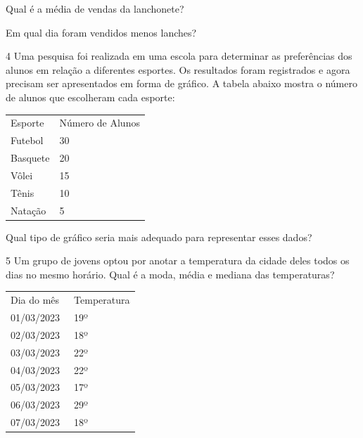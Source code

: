 \begin{escolha}

    \item Qual é a média de vendas da lanchonete?

    \item{}

    \item Em qual dia foram vendidos menos lanches?

    \item {}

\end{escolha}

\num{4} Uma pesquisa foi realizada em uma escola para determinar as
preferências dos alunos em relação a diferentes esportes. Os resultados
foram registrados e agora precisam ser apresentados em forma de gráfico.
A tabela abaixo mostra o número de alunos que escolheram cada
esporte:

\begin{longtable}[]{@{}ll@{}}
\toprule
\tabularnewline
\midrule
\endhead
Esporte & Número de Alunos\tabularnewline
Futebol & 30\tabularnewline
Basquete & 20\tabularnewline
Vôlei & 15\tabularnewline
Tênis & 10\tabularnewline
Natação & 5\tabularnewline
\bottomrule
\end{longtable}

Qual tipo de gráfico seria mais adequado para representar esses dados?


\num{5} Um grupo de jovens optou por anotar a temperatura da cidade deles
todos os dias no mesmo horário. Qual é a moda, média e mediana das
temperaturas?

\begin{longtable}[]{@{}ll@{}}
\toprule
\endhead
Dia do mês~ & Temperatura\tabularnewline
01/03/2023 & 19º\tabularnewline
02/03/2023 & 18º\tabularnewline
03/03/2023 & 22º\tabularnewline
04/03/2023 & 22º\tabularnewline
05/03/2023 & 17º\tabularnewline
06/03/2023 & 29º\tabularnewline
07/03/2023 & 18º\tabularnewline
\bottomrule
\end{longtable}

